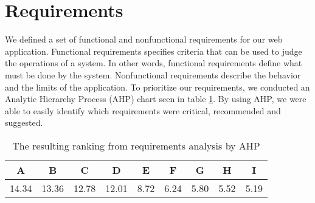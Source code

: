\section{Requirements}
We defined a set of functional and nonfunctional requirements for our web application. Functional requirements specifies criteria that can be used to judge the operations of a system. In other words, functional requirements define what must be done by the system. Nonfunctional requirements describe the behavior and the limits of the application. To prioritize our requirements, we conducted an Analytic Hierarchy Process (AHP) chart seen in table \ref{ahp}. By using AHP, we were able to easily identify which requirements were critical, recommended and suggested.
\FloatBarrier
\begin{table}[ht]
\centering
\begin{tabular}{|c|c|c|c|c|c|c|c|c|}
	\hline
	A & B & C & D & E & F & G & H & I  \\
	\hline
	14.34 & 13.36 & 12.78 & 12.01 & 8.72 & 6.24 & 5.80 & 5.52 & 5.19 \\
	\hline
\end{tabular}
\caption{The resulting ranking from requirements analysis by AHP}
\label{ahp}
\end{table}
\FloatBarrier

